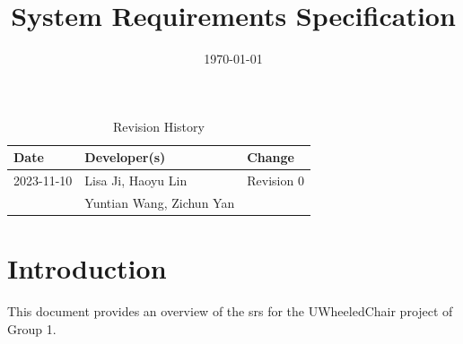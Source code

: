 \documentclass[12pt]{article}
\title{System Requirements Specification\\\progname}
\author{\authname}
\date{\today}
\begin{document}
\maketitle
{}

\newpage
\begin{table}[hp]
    \caption{Revision History} \label{TblRevisionHistory}
    \begin{tabularx}{\textwidth}{llX}
        \toprule
        \textbf{Date} & \textbf{Developer(s)}    & \textbf{Change} \\
        \midrule
        2023-11-10    & Lisa Ji, Haoyu Lin       & Revision 0      \\
                      & Yuntian Wang, Zichun Yan &                 \\
        \bottomrule
    \end{tabularx}
\end{table}

\newpage
\tableofcontents
\newpage
\listoftables
\listoffigures

\newpage
\section{Introduction}
This document provides an overview of the \acrfull{srs} for the UWheeledChair project of Group 1.
\end{document}
